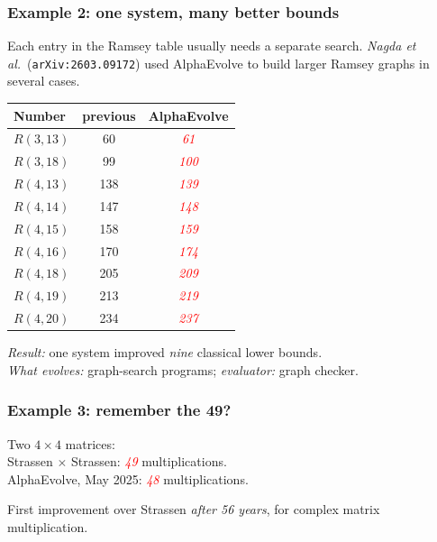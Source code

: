 \documentclass{beamer}
\theoremstyle{definition}
\newcommand\remph[1]{\emph{\textcolor{red}{#1}}}
\begin{document}
\begin{frame}
  \frametitle{Example 2: one system, many better bounds}
  Each entry in the Ramsey table usually needs a separate search.
  \emph{Nagda et al.}\ (\texttt{arXiv:2603.09172}) used AlphaEvolve to
  build larger Ramsey graphs in several cases.
  \pause
  \vspace{.2cm}

  \begin{center}
    \footnotesize
    \begin{tabular}{l|cc}
      Number & previous & AlphaEvolve \\
      \hline
      \( R(3,13) \) & 60 & \remph{61} \\
      \( R(3,18) \) & 99 & \remph{100} \\
      \( R(4,13) \) & 138 & \remph{139} \\
      \( R(4,14) \) & 147 & \remph{148} \\
      \( R(4,15) \) & 158 & \remph{159} \\
      \( R(4,16) \) & 170 & \remph{174} \\
      \( R(4,18) \) & 205 & \remph{209} \\
      \( R(4,19) \) & 213 & \remph{219} \\
      \( R(4,20) \) & 234 & \remph{237} \\
    \end{tabular}
  \end{center}
  \pause
  \vspace{.2cm}

  \emph{Result:} one system improved \emph{nine} classical lower bounds. \\
  \emph{What evolves:} graph-search programs; \emph{evaluator:} graph checker.
\end{frame}


\begin{frame}
  \frametitle{Example 3: remember the 49?}
  \pause
  \begin{center}
    \large
    Two \( 4 \times 4 \) matrices: \\
    \pause
    \vspace{.3cm}
    Strassen \( \times \) Strassen: \remph{49} multiplications. \\
    \pause
    \vspace{.4cm}
    AlphaEvolve, May 2025: \remph{48} multiplications.
    \pause
    \vspace{.6cm}

    \normalsize
    First improvement over Strassen \emph{after 56 years}, for
    complex matrix multiplication.
  \end{center}
\end{frame}
\end{document}
